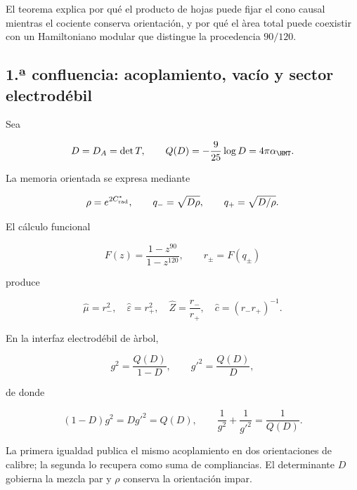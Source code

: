 El teorema explica por qu\'e el producto de hojas puede fijar el cono causal
mientras el cociente conserva orientaci\'on, y por qu\'e el \`area total puede
coexistir con un Hamiltoniano modular que distingue la procedencia \(90/120\).

\subsection{1.ª confluencia: acoplamiento, vacío y sector electrodébil}

Sea

\begin{equation}
 D=D_A=\det T,
 \qquad
 Q(D)=-\frac9{25}\log D=4\pi\alpha_{\HMT}.
 \label{rm:eq:confluence-q-d}
\end{equation}

La memoria orientada se expresa mediante

\begin{equation}
 \rho=e^{2C^*_{\rm rad}},
 \qquad
 q_-=\sqrt{D\rho},
 \qquad
 q_+=\sqrt{D/\rho}.
 \label{rm:eq:confluence-qpm}
\end{equation}

El c\'alculo funcional

\begin{equation}
 F(z)=\frac{1-z^{90}}{1-z^{120}},
 \qquad
 r_\pm=F(q_\pm)
 \label{rm:eq:confluence-F}
\end{equation}

produce

\begin{equation}
 \widehat\mu=r_-^2,
 \quad
 \widehat\varepsilon=r_+^2,
 \quad
 \widehat Z=\frac{r_-}{r_+},
 \quad
 \widehat c=(r_-r_+)^{-1}.
 \label{rm:eq:confluence-vacuum}
\end{equation}

En la interfaz electrod\'ebil de \`arbol,

\begin{equation}
 g^2=\frac{Q(D)}{1-D},
 \qquad
 g'^2=\frac{Q(D)}{D},
 \label{rm:eq:confluence-gauge-couplings}
\end{equation}

de donde

\begin{equation}
 \boxed{
 (1-D)g^2=Dg'^2=Q(D),
 \qquad
 \frac1{g^2}+\frac1{g'^2}=\frac1{Q(D)}.}
 \label{rm:eq:confluence-ew-master}
\end{equation}

La primera igualdad publica el mismo acoplamiento en dos orientaciones de
calibre; la segunda lo recupera como suma de compliancias. El determinante
\(D\) gobierna la mezcla par y \(\rho\) conserva la orientaci\'on impar.

